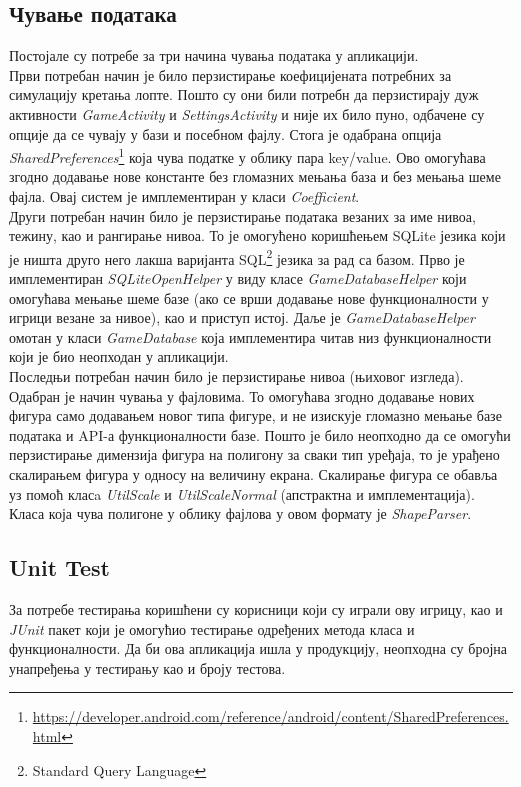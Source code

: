 \subsection{Чување података}
Постојале су потребе за три начина чувања података у апликацији. 
\\ \indent 
Први потребан начин је било перзистирање коефицијената потребних за симулацију кретања лопте. Пошто су они били потребн да перзистирају дуж активности \emph{GameActivity} и \emph{SettingsActivity} и није их било пуно, одбачене су опције да се чувају у бази и посебном фајлу. Стога је одабрана опција \emph{SharedPreferences}\footnote{\url{https://developer.android.com/reference/android/content/SharedPreferences.html}} која чува податке у облику пара key/value. Ово омогућава згодно додавање нове константе без гломазних мењања база и без мењања шеме фајла. Овај систем је имплементиран у класи \emph{Coefficient}.
\\ \indent 
Други потребан начин било је перзистирање података везаних за име нивоа, тежину, као и рангирање нивоа. То је омогућено коришћењем SQLite језика који је ништа друго него лакша варијанта SQL\footnote{Standard Query Language} језика за рад са базом. Прво је имплементиран \emph{SQLiteOpenHelper} у виду класе \emph{GameDatabaseHelper} који омогућава мењање шеме базе (ако се врши додавање нове функционалности у игрици везане за нивое), као и приступ истој. Даље је \emph{GameDatabaseHelper} омотан у класи \emph{GameDatabase} која имплементира читав низ функционалности који је био неопходан у апликацији. 
\\ \indent 
Последњи потребан начин било је перзистирање нивоа (њиховог изгледа). Одабран је начин чувања у фајловима. То омогућава згодно додавање нових фигура само додавањем новог типа фигуре, и не изискује гломазно мењање базе података и API-а функционалности базе. Пошто је било неопходно да се омогући перзистирање димензија фигура на полигону за сваки тип уређаја, то је урађено скалирањем фигура у односу на величину екрана. Скалирање фигура се обавља уз помоћ класa \emph{UtilScale} и \emph{UtilScaleNormal} (апстрактна и имплементација). Класа која чува полигоне у облику фајлова у овом формату је \emph{ShapeParser}. 

\subsection{Unit Test}
За потребе тестирања коришћени су корисници који су играли ову игрицу, као и \emph{JUnit} пакет који је омогућио тестирање одређених метода класа и функционалности. Да би ова апликација ишла у продукцију, неопходна су бројна унапређења у тестирању као и броју тестова.

